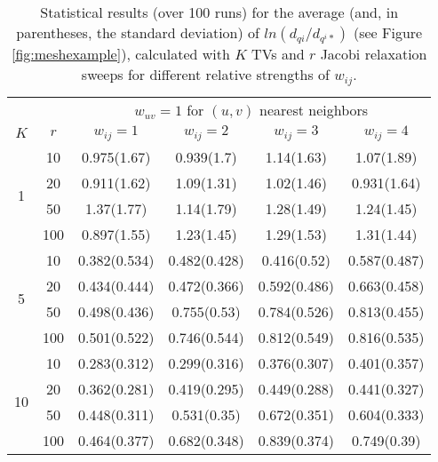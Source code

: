 \documentclass[final]{siamltex}
\begin{document}
\begin{table}[h]
\begin{center}
{
\begin{tabular}{|c|c|cccc|}
\hline
& & \multicolumn{4}{c|}{$w_{uv}=1$ for $(u,v)$ nearest neighbors} \\ \cline{3-6}
$K$ & $r$ & $w_{ij}=1$ & $w_{ij}=2$ & $w_{ij}=3$ & $w_{ij}=4$\\
\hline
\multicolumn{1}{|c|}{\multirow{4}{*}{1}} &
\multicolumn{1}{|c|}{10} & 0.975(1.67) & 0.939(1.7) & 1.14(1.63) & 1.07(1.89)\\
\multicolumn{1}{|c|}{}                        &
\multicolumn{1}{|c|}{20} & 0.911(1.62) & 1.09(1.31) & 1.02(1.46) & 0.931(1.64) \\
\multicolumn{1}{|c|}{}                        &
\multicolumn{1}{|c|}{50} & 1.37(1.77) & 1.14(1.79) & 1.28(1.49) & 1.24(1.45) \\
\multicolumn{1}{|c|}{}                        &
\multicolumn{1}{|c|}{100} & 0.897(1.55) & 1.23(1.45) & 1.29(1.53) & 1.31(1.44) \\
\hline
\multicolumn{1}{|c|}{\multirow{4}{*}{5}} &
\multicolumn{1}{|c|}{10} & 0.382(0.534) & 0.482(0.428) & 0.416(0.52) & 0.587(0.487) \\
\multicolumn{1}{|c|}{}                        &
\multicolumn{1}{|c|}{20} & 0.434(0.444) & 0.472(0.366) & 0.592(0.486) & 0.663(0.458) \\
\multicolumn{1}{|c|}{}                        &
\multicolumn{1}{|c|}{50} &   0.498(0.436) & 0.755(0.53) & 0.784(0.526) & 0.813(0.455) \\
\multicolumn{1}{|c|}{}                        &
\multicolumn{1}{|c|}{100} & 0.501(0.522) & 0.746(0.544) & 0.812(0.549) & 0.816(0.535) \\
\hline
\multicolumn{1}{|c|}{\multirow{4}{*}{10}} &
\multicolumn{1}{|c|}{10} & 0.283(0.312) & 0.299(0.316) & 0.376(0.307) & 0.401(0.357) \\
\multicolumn{1}{|c|}{}                        &
\multicolumn{1}{|c|}{20} & 0.362(0.281) & 0.419(0.295) & 0.449(0.288) & 0.441(0.327) \\
\multicolumn{1}{|c|}{}                        &
\multicolumn{1}{|c|}{50} & 0.448(0.311) & 0.531(0.35) & 0.672(0.351) & 0.604(0.333) \\
\multicolumn{1}{|c|}{}                        &
\multicolumn{1}{|c|}{100} & 0.464(0.377) & 0.682(0.348) & 0.839(0.374) & 0.749(0.39) \\
\hline
\end{tabular}
}
\caption{Statistical results (over 100 runs) for the average (and, in parentheses,
the standard deviation) of $ln(d_{qi}/d_{q^i*})$ (see Figure
\ref{fig:meshexample}), calculated with
$K$ TVs and $r$ Jacobi relaxation sweeps for different relative strengths of $w_{ij}$.}
\label{tab:meshexampleNonDiag}
\end{center}
\end{table}
\end{document}

